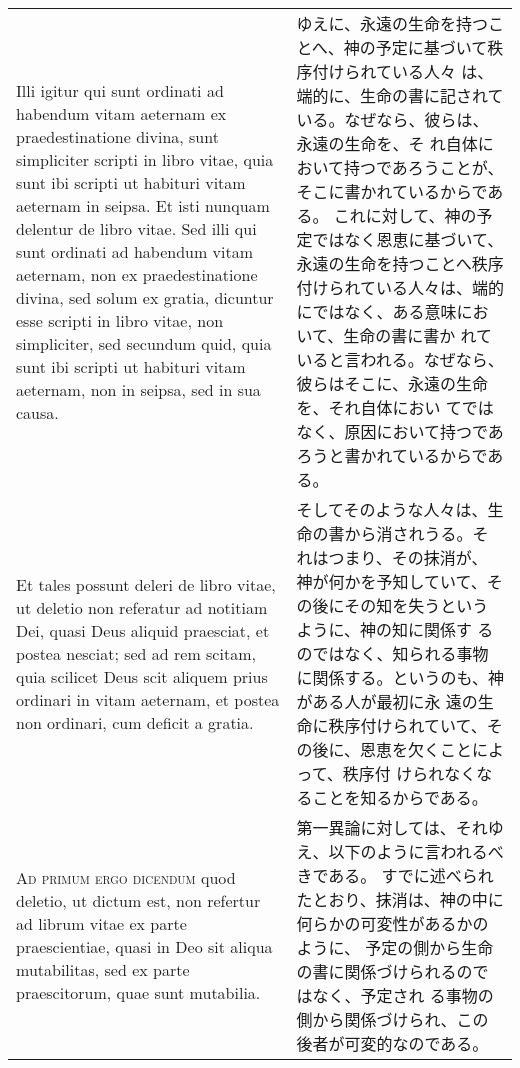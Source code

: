 \documentclass[10pt]{jsarticle} %
\begin{document}
\begin{longtable}{p{21em}p{21em}}
\\


Illi igitur qui sunt ordinati ad
habendum vitam aeternam ex praedestinatione divina, sunt simpliciter
scripti in libro vitae, quia sunt ibi scripti ut habituri vitam aeternam
in seipsa. Et isti nunquam delentur de libro vitae. Sed illi qui sunt
ordinati ad habendum vitam aeternam, non ex praedestinatione divina, sed
solum ex gratia, dicuntur esse scripti in libro vitae, non simpliciter,
sed secundum quid, quia sunt ibi scripti ut habituri vitam aeternam, non
in seipsa, sed in sua causa. 


&

ゆえに、永遠の生命を持つことへ、神の予定に基づいて秩序付けられている人々
 は、端的に、生命の書に記されている。なぜなら、彼らは、永遠の生命を、そ
 れ自体において持つであろうことが、そこに書かれているからである。
これに対して、神の予定ではなく恩恵に基づいて、永遠の生命を持つことへ秩序
 付けられている人々は、端的にではなく、ある意味において、生命の書に書か
 れていると言われる。なぜなら、彼らはそこに、永遠の生命を、それ自体におい
 てではなく、原因において持つであろうと書かれているからである。


\\


Et tales possunt deleri de libro vitae, ut
deletio non referatur ad notitiam Dei, quasi Deus aliquid praesciat, et
postea nesciat; sed ad rem scitam, quia scilicet Deus scit aliquem prius
ordinari in vitam aeternam, et postea non ordinari, cum deficit a
gratia.


&

そしてそのような人々は、生命の書から消されうる。それはつまり、その抹消が、
神が何かを予知していて、その後にその知を失うというように、神の知に関係す
 るのではなく、知られる事物に関係する。というのも、神がある人が最初に永
 遠の生命に秩序付けられていて、その後に、恩恵を欠くことによって、秩序付
 けられなくなることを知るからである。


\\


{\scshape Ad primum ergo dicendum} quod deletio, ut
dictum est, non refertur ad librum vitae ex parte praescientiae, quasi
in Deo sit aliqua mutabilitas, sed ex parte praescitorum, quae sunt
mutabilia.


&

第一異論に対しては、それゆえ、以下のように言われるべきである。
すでに述べられたとおり、抹消は、神の中に何らかの可変性があるかのように、
 予定の側から生命の書に関係づけられるのではなく、予定され
 る事物の側から関係づけられ、この後者が可変的なのである。



\end{longtable}
\end{document}
